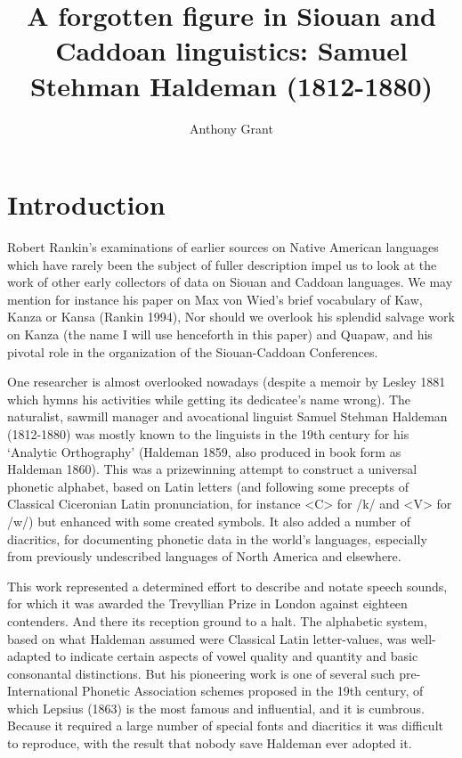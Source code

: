 \documentclass[output=paper]{LSP/langsci}
\author{Anthony Grant}
\title{A forgotten figure in Siouan and Caddoan linguistics:  Samuel Stehman Haldeman (1812-1880)}
\begin{document}
\section{Introduction}

Robert Rankin's examinations of earlier sources on Native American languages which have rarely been the subject of fuller description impel us to look at the work of other early collectors of data on Siouan and Caddoan languages. We may mention for instance his paper on Max von Wied's brief vocabulary of Kaw, Kanza or Kansa  (Rankin 1994), Nor should we overlook his splendid salvage work on Kanza (the name I will use henceforth in this paper) and Quapaw, and his pivotal role in the organization of the Siouan-Caddoan Conferences.

One researcher is almost overlooked nowadays (despite a memoir by Lesley 1881 which hymns his activities while getting its dedicatee's name wrong). The naturalist, sawmill manager and avocational linguist Samuel Stehman Haldeman (1812-1880)  was mostly known to the linguists in the 19th century for his `Analytic Orthography' (Haldeman 1859, also produced in book form as Haldeman 1860). This was a prizewinning attempt to construct a  universal phonetic alphabet, based on Latin letters (and following some precepts of Classical Ciceronian Latin pronunciation, for instance <C> for /k/ and <V> for /w/) but enhanced with some created symbols. It also added a number of diacritics,  for documenting phonetic data in the world's languages, especially from previously undescribed languages of North America and elsewhere.  

This work represented a determined effort to describe and notate speech sounds, for which it was awarded the Trevyllian Prize in London against eighteen contenders. And there its reception ground to a halt. The alphabetic system, based on what Haldeman assumed were Classical Latin letter-values,  was well-adapted to indicate certain aspects of vowel quality and quantity and basic consonantal distinctions. But his pioneering work is one of several such pre-International Phonetic Association  schemes proposed in the 19th century, of which Lepsius (1863) is the most famous and influential, and it is cumbrous.  Because it required a large number of special fonts and diacritics it was difficult to reproduce, with the result that nobody save Haldeman ever adopted it.    
\end{document}
